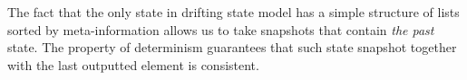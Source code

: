 The fact that the only state in drifting state model has a simple structure of lists sorted by meta-information allows us to take snapshots that contain {\em the past} state. The property of determinism guarantees that such state snapshot together with the last outputted element is consistent. 









